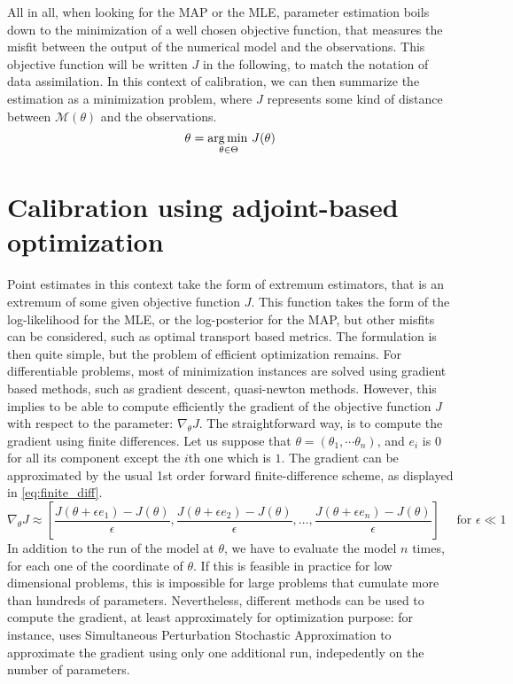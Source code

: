 \documentclass[../../Main_ManuscritThese.tex]{subfiles}
\begin{document}
All in all, when looking for the MAP or the MLE, parameter estimation boils down to the minimization of a well chosen objective function, that measures the misfit between the output of the numerical model and the observations. This objective function will be written $J$ in the following, to match the notation of data assimilation. 
In this context of calibration, we can then summarize the estimation as a minimization problem, where $J$ represents some kind of distance between $\mathcal{M}(\theta)$ and the observations.
\begin{equation}
  {\theta}_{\mathrm{}} = \operatorname*{arg\,min \,}_{\theta\in \Theta} J(\theta)
\end{equation}

\section{Calibration using adjoint-based optimization}
\label{sec:calibration_adjoint_optimization}
Point estimates in this context take the form of extremum estimators, that is an extremum of some given objective function $J$. This function takes the form of the log-likelihood for the MLE, or the log-posterior for the MAP, but other misfits can be considered, such as optimal transport based metrics. The formulation is then quite simple, but the problem of efficient optimization remains. For differentiable problems, most of minimization instances are solved using gradient based methods, such as gradient descent, quasi-newton methods.
However, this implies to be able to compute efficiently the gradient of the objective function $J$ with respect to the parameter: $\nabla_{\theta} J$. The straightforward way, is to compute the gradient using finite differences. Let us suppose that $\theta = (\theta_1,\cdots \theta_n)$, and $e_i$ is 0 for all its component except the $i$th one which is $1$. The gradient can be approximated by the usual 1st order forward finite-difference scheme, as displayed in \cref{eq:finite_diff}.
\begin{equation}
  \label{eq:finite_diff}
  \nabla_{\theta} J  \approx \left[\frac{J(\theta + \epsilon e_1) - J(\theta)}{\epsilon}, \frac{J(\theta + \epsilon e_2) - J(\theta)}{ \epsilon},\dots, \frac{J(\theta + \epsilon e_n)- J(\theta)}{\epsilon} \right] \quad \text{ for } \epsilon \ll 1
\end{equation}
In addition to the run of the model at $\theta$, we have to evaluate the model $n$ times, for each one of the coordinate of $\theta$. If this is feasible in practice for low dimensional problems, this is impossible for large problems that cumulate more than hundreds of parameters. Nevertheless, different methods can be used to compute the gradient, at least approximately for optimization purpose: for instance, \cite{boutet_estimation_2015} uses Simultaneous Perturbation Stochastic Approximation to approximate the gradient using only one additional run, indepedently on the number of parameters.
\end{document}

